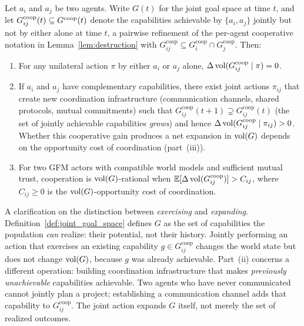 \begin{lemma}
\label{lem:cooperation}
Let $a_i$ and $a_j$ be two agents. Write $G(t)$ for the joint goal space at
    time $t$, and let $G^{\mathrm{coop}}_{ij}(t) \subseteq G^{\mathrm{coop}}(t)$ denote
    the capabilities achievable by $\{a_i, a_j\}$ jointly but not by either
    alone at time $t$, a pairwise refinement of the per-agent cooperative
    notation in Lemma~\ref{lem:destruction} with $G^{\mathrm{coop}}_{ij}
    \subseteq G^{\mathrm{coop}}_i \cap G^{\mathrm{coop}}_j$. Then:
\begin{enumerate}
\item[\textbf{(i)}] For any unilateral action $\pi$ by either $a_i$ or $a_j$ alone, $\Delta \operatorname{vol}(G^{\mathrm{coop}}_{ij} \mid \pi) = 0$.
\item[\textbf{(ii)}] If $a_i$ and $a_j$ have complementary capabilities, there exist joint actions $\pi_{ij}$ that create new coordination infrastructure (communication channels, shared protocols, mutual commitments) such that $G^{\mathrm{coop}}_{ij}(t+1) \supsetneq G^{\mathrm{coop}}_{ij}(t)$ (the set of jointly achievable capabilities \emph{grows}) and hence $\Delta \operatorname{vol}(G^{\mathrm{coop}}_{ij} \mid \pi_{ij}) > 0$. Whether this cooperative gain produces a net expansion in $\operatorname{vol}(G)$ depends on the opportunity cost of coordination (part~(iii)).
\item[\textbf{(iii)}] For two GFM actors with compatible world models and sufficient mutual trust, cooperation is $\operatorname{vol}(G)$-rational when $\mathbb{E}[\Delta \operatorname{vol}(G^{\mathrm{coop}}_{ij})] > C_{ij}$, where $C_{ij} \geq 0$ is the $\operatorname{vol}(G)$-opportunity cost of coordination.
\end{enumerate}
\end{lemma}

A clarification on the distinction between \emph{exercising} and
\emph{expanding}. Definition~\ref{def:joint_goal_space} defines $G$ as the set
of capabilities the population \emph{can} realize: their potential, not their
history. Jointly performing an action that exercises an existing capability $g
\in G^{\mathrm{coop}}_{ij}$ changes the world state but does not change
$\operatorname{vol}(G)$, because $g$ was already achievable. Part~(ii) concerns a different
operation: building coordination infrastructure that makes \emph{previously
unachievable} capabilities achievable. Two agents who have never communicated
cannot jointly plan a project; establishing a communication channel adds that
capability to $G^{\mathrm{coop}}_{ij}$. The joint action expands $G$ itself,
not merely the set of realized outcomes.

